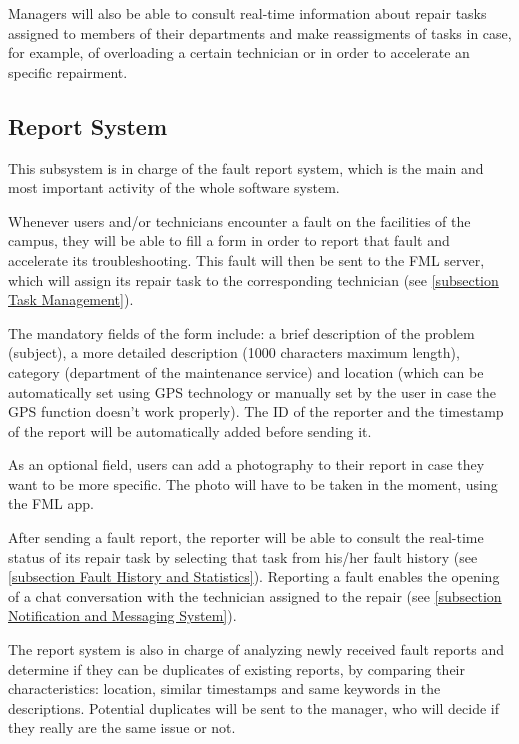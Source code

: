 Managers will also be able to consult real-time information about repair tasks assigned to members of their departments and make reassigments of tasks in case, for example, of overloading a certain technician or in order to accelerate an specific repairment.

\subsection{Report System}
\label{subsection Report System}

This subsystem is in charge of the fault report system, which is the main and most important activity of the whole software system.

Whenever users and/or technicians encounter a fault on the facilities of the campus, they will be able to fill a form in order to report that fault and accelerate its troubleshooting. This fault will then be sent to the FML server, which will assign its repair task to the corresponding technician (see \ref{subsection Task Management}).

The mandatory fields of the form include: a brief description of the problem (subject), a more detailed description (1000 characters maximum length), category (department of the maintenance service) and location (which can be automatically set using GPS technology or manually set by the user in case the GPS function doesn't work properly). The ID of the reporter and the timestamp of the report will be automatically added before sending it. 

As an optional field, users can add a photography to their report in case they want to be more specific. The photo will have to be taken in the moment, using the FML app.

After sending a fault report, the reporter will be able to consult the real-time status of its repair task by selecting that task from his/her fault history (see \ref{subsection Fault History and Statistics}). Reporting a fault enables the opening of a chat conversation with the technician assigned to the repair (see \ref{subsection Notification and Messaging System}).

The report system is also in charge of analyzing newly received fault reports and determine if they can be duplicates of existing reports, by comparing their characteristics: location, similar timestamps and same keywords in the descriptions. Potential duplicates will be sent to the manager, who will decide if they really are the same issue or not.

